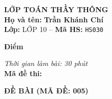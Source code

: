 \noindent
\begin{tcolorbox}[colback=white,colframe=black,arc=0mm,boxrule=0.8pt,top=4pt,bottom=4pt,left=6pt,right=6pt]
	\begin{minipage}[c]{0.44\textwidth}
		{\bfseries\large LỚP TOÁN THẦY THÔNG}\\[3pt]
		\textbf{Họ và tên:} \textbf{\large Trần Khánh Chí}\\[3pt]
		\textbf{Lớp:} LỚP 10 \quad -- \quad \textbf{Mã HS:} \texttt{HS030}
	\end{minipage}
	\hfill
	\begin{minipage}[c]{0.22\textwidth}
		\begin{tcolorbox}[colback=white,colframe=black,arc=0mm,boxrule=0.6pt,height=1.8cm,halign=center,valign=top,top=2pt]
			{\bfseries\normalsize Điểm}
		\end{tcolorbox}
	\end{minipage}
	\hfill
	\begin{minipage}[c]{0.30\textwidth}
		\raggedleft
		\textit{Thời gian làm bài: 30 phút}\\[4pt]
		\textbf{Mã đề thi:} 
	\end{minipage}
\end{tcolorbox}
\vspace{0.25cm}

\noindent\textbf{\large ĐỀ BÀI (MÃ ĐỀ: 005)}
\vspace{0.1cm}

